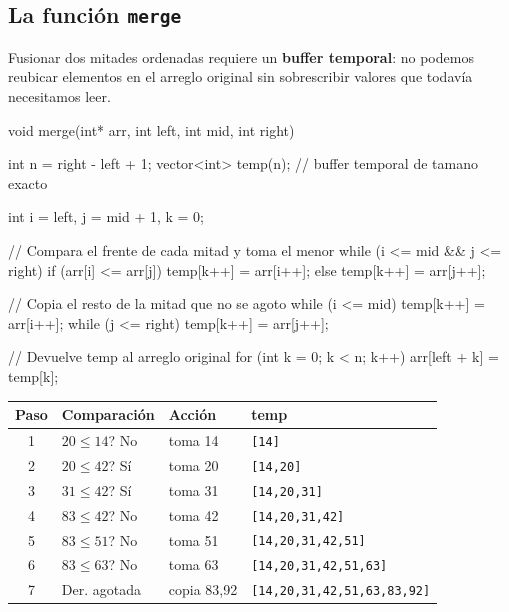 \documentclass[12pt, oneside]{article}
\begin{document}
\subsection{La función \texttt{merge}}

Fusionar dos mitades ordenadas requiere un \textbf{buffer temporal}: no podemos
reubicar elementos en el arreglo original sin sobrescribir valores que todavía
necesitamos leer.

\begin{codigo}[caption={merge: fusión de dos mitades ordenadas}]
void merge(int* arr, int left, int mid, int right) {
    int n = right - left + 1;
    vector<int> temp(n);          // buffer temporal de tamano exacto

    int i = left, j = mid + 1, k = 0;

    // Compara el frente de cada mitad y toma el menor
    while (i <= mid && j <= right) {
        if (arr[i] <= arr[j])
            temp[k++] = arr[i++];
        else
            temp[k++] = arr[j++];
    }

    // Copia el resto de la mitad que no se agoto
    while (i <= mid)   temp[k++] = arr[i++];
    while (j <= right) temp[k++] = arr[j++];

    // Devuelve temp al arreglo original
    for (int k = 0; k < n; k++)
        arr[left + k] = temp[k];
}
\end{codigo}

\begin{ejemplo}
  \begin{center}
  \begin{tabular}{clll}
    \toprule
    \textbf{Paso} & \textbf{Comparación} & \textbf{Acción} & \textbf{temp} \\
    \midrule
    1 & $20 \leq 14$? No  & toma 14 & \texttt{[14]} \\
    2 & $20 \leq 42$? Sí  & toma 20 & \texttt{[14,20]} \\
    3 & $31 \leq 42$? Sí  & toma 31 & \texttt{[14,20,31]} \\
    4 & $83 \leq 42$? No  & toma 42 & \texttt{[14,20,31,42]} \\
    5 & $83 \leq 51$? No  & toma 51 & \texttt{[14,20,31,42,51]} \\
    6 & $83 \leq 63$? No  & toma 63 & \texttt{[14,20,31,42,51,63]} \\
    7 & Der. agotada        & copia 83,92 & \texttt{[14,20,31,42,51,63,83,92]} \\
    \bottomrule
  \end{tabular}
  \end{center}
\end{ejemplo}
\end{document}
